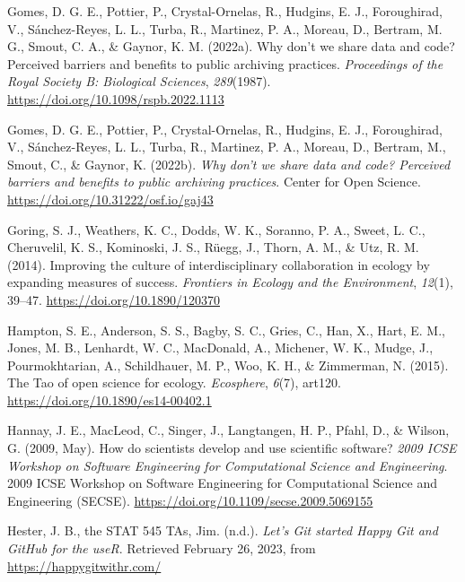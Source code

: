 \begin{CSLReferences}{1}{0}
\leavevmode{}%
Gomes, D. G. E., Pottier, P., Crystal-Ornelas, R., Hudgins, E. J., Foroughirad, V., Sánchez-Reyes, L. L., Turba, R., Martinez, P. A., Moreau, D., Bertram, M. G., Smout, C. A., \& Gaynor, K. M. (2022a). Why don't we share data and code? Perceived barriers and benefits to public archiving practices. \emph{Proceedings of the Royal Society B: Biological Sciences}, \emph{289}(1987). \url{https://doi.org/10.1098/rspb.2022.1113}

\leavevmode{}%
Gomes, D. G. E., Pottier, P., Crystal-Ornelas, R., Hudgins, E. J., Foroughirad, V., Sánchez-Reyes, L. L., Turba, R., Martinez, P. A., Moreau, D., Bertram, M., Smout, C., \& Gaynor, K. (2022b). \emph{Why don't we share data and code? Perceived barriers and benefits to public archiving practices}. Center for Open Science. \url{https://doi.org/10.31222/osf.io/gaj43}

\leavevmode{}%
Goring, S. J., Weathers, K. C., Dodds, W. K., Soranno, P. A., Sweet, L. C., Cheruvelil, K. S., Kominoski, J. S., Rüegg, J., Thorn, A. M., \& Utz, R. M. (2014). Improving the culture of interdisciplinary collaboration in ecology by expanding measures of success. \emph{Frontiers in Ecology and the Environment}, \emph{12}(1), 39--47. \url{https://doi.org/10.1890/120370}

\leavevmode{}%
Hampton, S. E., Anderson, S. S., Bagby, S. C., Gries, C., Han, X., Hart, E. M., Jones, M. B., Lenhardt, W. C., MacDonald, A., Michener, W. K., Mudge, J., Pourmokhtarian, A., Schildhauer, M. P., Woo, K. H., \& Zimmerman, N. (2015). The Tao of open science for ecology. \emph{Ecosphere}, \emph{6}(7), art120. \url{https://doi.org/10.1890/es14-00402.1}

\leavevmode{}%
Hannay, J. E., MacLeod, C., Singer, J., Langtangen, H. P., Pfahl, D., \& Wilson, G. (2009, May). How do scientists develop and use scientific software? \emph{2009 ICSE Workshop on Software Engineering for Computational Science and Engineering}. 2009 ICSE Workshop on Software Engineering for Computational Science and Engineering (SECSE). \url{https://doi.org/10.1109/secse.2009.5069155}

\leavevmode{}%
Hester, J. B., the STAT 545 TAs, Jim. (n.d.). \emph{Let's Git started \textbar{} Happy Git and GitHub for the useR}. Retrieved February 26, 2023, from \url{https://happygitwithr.com/}


\end{CSLReferences}
